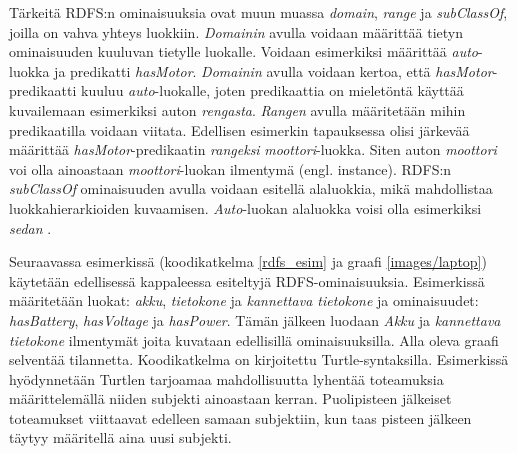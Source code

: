\documentclass[finnish, 12pt, a4paper, elec, utf8, pdfa, online]{aaltothesis}
\begin{document}
{Tärkeitä RDFS:n ominaisuuksia ovat muun muassa \textit{domain}, \textit{range} ja \textit{subClassOf}, joilla on vahva yhteys luokkiin. \textit{Domainin} avulla voidaan määrittää tietyn ominaisuuden kuuluvan tietylle luokalle. Voidaan esimerkiksi määrittää \textit{auto}-luokka ja predikatti \textit{hasMotor}. \textit{Domainin} avulla voidaan kertoa, että \textit{hasMotor}-predikaatti kuuluu \textit{auto}-luokalle, joten predikaattia on mieletöntä käyttää kuvailemaan esimerkiksi auton \textit{rengasta}. \textit{Rangen} avulla määritetään mihin predikaatilla voidaan viitata. Edellisen esimerkin tapauksessa olisi järkevää määrittää \textit{hasMotor}-predikaatin \textit{rangeksi} \textit{moottori}-luokka. Siten auton \textit{moottori} voi olla ainoastaan \textit{moottori}-luokan ilmentymä (engl. instance). RDFS:n \textit{subClassOf} ominaisuuden avulla voidaan esitellä alaluokkia, mikä mahdollistaa luokkahierarkioiden kuvaamisen. \textit{Auto}-luokan alaluokka voisi olla esimerkiksi \textit{sedan}
\cite{W3C_RDFS2}.

Seuraavassa esimerkissä (koodikatkelma \ref{rdfs_esim} ja graafi \ref{images/laptop}) käytetään edellisessä kappaleessa esiteltyjä RDFS-ominaisuuksia. Esimerkissä määritetään luokat: \textit{akku}, \textit{tietokone} ja \textit{kannettava tietokone} ja ominaisuudet: \textit{hasBattery}, \textit{hasVoltage} ja \textit{hasPower}. Tämän jälkeen luodaan \textit{Akku} ja \textit{kannettava tietokone} ilmentymät joita kuvataan edellisillä ominaisuuksilla. Alla oleva graafi selventää tilannetta. Koodikatkelma on kirjoitettu Turtle-syntaksilla. Esimerkissä hyödynnetään Turtlen tarjoamaa mahdollisuutta lyhentää toteamuksia määrittelemällä niiden subjekti ainoastaan kerran. Puolipisteen jälkeiset toteamukset viittaavat edelleen samaan subjektiin, kun taas pisteen jälkeen täytyy määritellä aina uusi subjekti.

}
\end{document}
